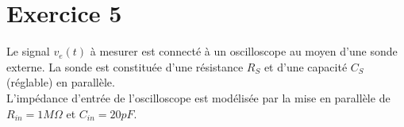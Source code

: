 







\section{Exercice 5}
Le signal $v_e(t)$ à mesurer est connecté à un oscilloscope au moyen d'une sonde externe. La sonde est constituée d'une résistance $R_S$ et d'une capacité $C_S$ (réglable) en parallèle.\\
L'impédance d'entrée de l'oscilloscope est modélisée par la mise en parallèle de $R_{in}=1M\Omega$ et $C_{in}=20pF$.\\
 
